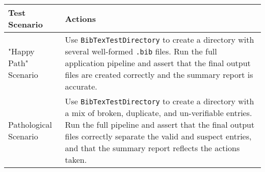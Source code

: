 \documentclass[11pt, a4paper]{article}
\begin{document}
\begin{table}[h!]
\centering
\begin{tabular}{lp{}}
\toprule
\textbf{Test Scenario} & \textbf{Actions} \\
\midrule
"Happy Path" Scenario &
Use \texttt{BibTexTestDirectory} to create a directory with several well-formed \texttt{.bib} files. Run the full application pipeline and assert that the final output files are created correctly and the summary report is accurate. \\
\addlinespace
Pathological Scenario &
Use \texttt{BibTexTestDirectory} to create a directory with a mix of broken, duplicate, and un-verifiable entries. Run the full pipeline and assert that the final output files correctly separate the valid and suspect entries, and that the summary report reflects the actions taken. \\
\bottomrule
\end{tabular}
\end{table}
\end{document}
